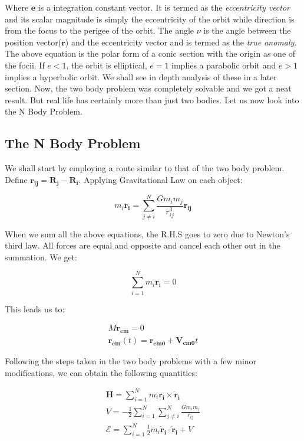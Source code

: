 \documentclass[12pt, letterpaper]{article}
\begin{document}
Where $\mathbf{e}$ is a integration constant vector. It is termed as the \textit{eccentricity vector} and its scalar magnitude is simply the eccentricity of the orbit while direction is from the focus to the perigee of the orbit. The angle $\nu$ is the angle between the position vector($\mathbf{r}$) and the eccentricity vector and is termed as the \textit{true anomaly}. The above equation is the polar form of a conic section with the origin as one of the focii. If $e < 1$, the orbit is elliptical, $e = 1$ implies a parabolic orbit and $e > 1$ implies a hyperbolic orbit. We shall see in depth analysis of these in a later section. Now, the two body problem was completely solvable and we got a neat result. But real life has certainly more than just two bodies. Let us now look into the N Body Problem.

\subsection{The N Body Problem}

We shall start by employing a route similar to that of the two body problem. Define $ \mathbf{r_{ij}} = \mathbf{R_{j}} - \mathbf{R_{i}}$. Applying Gravitational Law on each object:

\begin{displaymath}
m_i\mathbf{\ddot{r}_i} = \sum_{j \neq i}^{N} \frac{Gm_im_j}{r_{ij}^3}\mathbf{r_{ij}}
\end{displaymath}

When we sum all the above equations, the R.H.S goes to zero due to Newton's third law. All forces are equal and opposite and cancel each other out in the summation. We get:

\begin{displaymath}
\sum_{i=1}^{N} m_i\mathbf{\ddot{r}_i} = 0
\end{displaymath}

This leads us to:

\begin{gather*}
M\mathbf{\ddot{r}_{cm}} = 0\\
\mathbf{r_{cm}}(t) = \mathbf{r_{cm0}} + \mathbf{V_{cm0}}t
\end{gather*}

Following the steps taken in the two body problems with a few minor modifications, we can obtain the following quantities:

\begin{gather*}
\mathbf{H} = \sum_{i=1}^{N} m_i\mathbf{r_i}\times\mathbf{\dot{r}_i}\\
V = -\frac{1}{2}\sum_{i=1}^{N}\sum_{j \neq i}^{N}\frac{Gm_im_j}{r_{ij}}\\
\mathcal{E} = \sum_{i=1}^{N}\frac{1}{2}m_i\mathbf{\dot{r}_i}\cdot\mathbf{\dot{r}_i} + V
\end{gather*}
\end{document}
